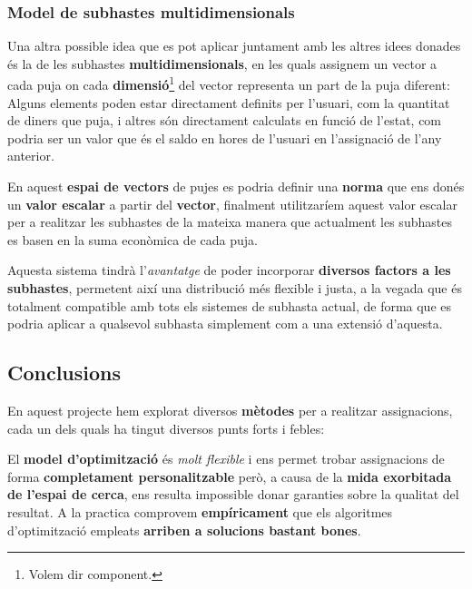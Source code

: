 \documentclass[10pt,twocolumn]{article}
\begin{document}
\subsubsection{Model de subhastes multidimensionals}
Una altra possible idea que es pot aplicar juntament amb les altres idees donades és la de les subhastes \textbf{multidimensionals}, en les quals assignem un vector a cada puja on cada \textbf{dimensió}\footnote{Volem dir component.} del vector representa un part de la puja diferent: Alguns elements poden estar directament definits per l'usuari, com la quantitat de diners que puja, i altres són directament calculats en funció de l'estat, com podria ser un valor que és el saldo en hores de l'usuari en l'assignació de l'any anterior.

En aquest \textbf{espai de vectors} de pujes es podria definir una \textbf{norma} que ens donés un \textbf{valor escalar} a partir del \textbf{vector}, finalment utilitzaríem aquest valor escalar per a realitzar les subhastes de la mateixa manera que actualment les subhastes es basen en la suma econòmica de cada puja.

Aquesta sistema tindrà l'\textit{avantatge} de poder incorporar \textbf{diversos factors a les subhastes}, permetent així una distribució més flexible i justa, a la vegada que és totalment compatible amb tots els sistemes de subhasta actual, de forma que es podria aplicar a qualsevol subhasta simplement com a una extensió d'aquesta.



\newpage															
\begin{tcolorbox}[colframe=white,colback=redviolet!20,sharp corners=all,size=minimal,halign=center,valign=center]
	\section{Conclusions}
\end{tcolorbox}
	En aquest projecte hem explorat diversos \textbf{mètodes} per a realitzar assignacions, cada un dels quals ha tingut diversos punts forts i febles:
	
	El \textbf{model d'optimització} és \textit{molt flexible} i ens permet trobar assignacions de forma \textbf{completament personalitzable} però, a causa de la \textbf{mida exorbitada de l'espai de cerca}, ens resulta impossible donar garanties sobre la qualitat del resultat. A la practica comprovem \textbf{empíricament} que els algoritmes d'optimització empleats \textbf{arriben a solucions bastant bones}.
	
\end{document}
